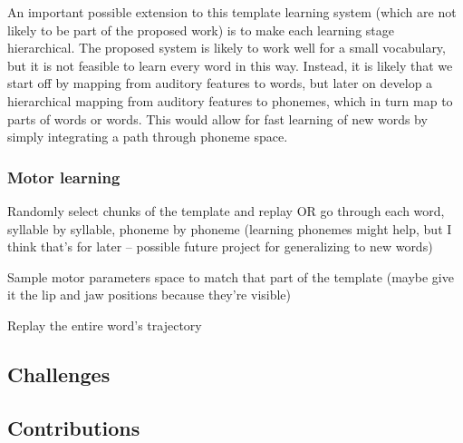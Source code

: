 \documentclass{article}
\begin{document}
An important possible extension to
this template learning system
(which are not likely to be
part of the proposed work)
is to make each learning stage
hierarchical.
The proposed system is likely
to work well for a small vocabulary,
but it is not feasible to learn
every word in this way.
Instead, it is likely that
we start off by mapping
from auditory features to words,
but later on develop a hierarchical mapping
from auditory features to phonemes,
which in turn map to parts of words or words.
This would allow for fast learning
of new words by simply integrating
a path through phoneme space.

\subsubsection{Motor learning}

Randomly select chunks of the template and replay
OR
go through each word, syllable by syllable, phoneme by phoneme
(learning phonemes might help, but I think that's for later
-- possible future project for generalizing to new words)

Sample motor parameters space to match that part of the template
(maybe give it the lip and jaw positions because they're visible)

Replay the entire word's trajectory

\subsection{Challenges}



\subsection{Contributions}





\end{document}
